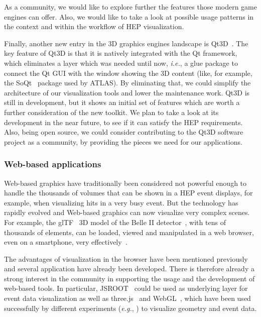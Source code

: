 \documentclass[12pt,a4paper]{article}
\begin{document}
As a community, we would like to explore further the features those modern game engines can offer. Also, we would like to take a
look at possible usage patterns in the context and within the workflow of HEP visualization.

Finally, another new entry in the 3D graphics engines landscape is Qt3D~\cite{Qt3d}. The key feature of Qt3D is that it is natively integrated with the Qt framework, which eliminates a layer which was needed until now, \textit{i.e.}, a glue
package to connect the Qt GUI with the window showing the 3D content (like, for example, the SoQt~\cite{soqt} package used by ATLAS). By eliminating that, we could simplify the architecture
of our visualization tools and lower the maintenance work. Qt3D is still in development, but it shows an initial set of
features which are worth a further consideration of the new toolkit. We plan to take a look at its development in the near future,
to see if it can satisfy the HEP requirements. Also, being open source, we could consider contributing to the Qt3D software
project as a community, by providing the pieces we need for our applications.

\hypertarget{web-based}{%
\subsubsection{Web-based applications}\label{web-based}}

Web-based graphics have traditionally been considered not powerful enough to handle the thousands of volumes that can be
shown in a HEP event displays, for example, when visualizing hits in a very busy event. But the technology has rapidly
evolved and Web-based graphics can now visualize very complex scenes.
For example, the glTF~\cite{glTF} 3D model of the Belle II detector~\cite{BelleII}, with tens of thousands of elements,
can be loaded, viewed and manipulated in a web browser, even on a smartphone, very effectively~\cite{SketchFabBelleII}.


The advantages of visualization in the browser have been mentioned
previously and several application have already been developed.
There is therefore already a strong interest in the community in supporting the usage and the development of web-based tools.
In particular, JSROOT~\cite{rootjs} could be used as
underlying layer for event data visualization as well as three.js~\cite{ThreeJS} and WebGL~\cite{WebGL2011}, which have been
used successfully by different experiments (\textit{e.g.}, \cite{ATLASTada2016,ATLASTracer2015,CMSISpyWebGL}) to visualize geometry and event data.
\end{document}
